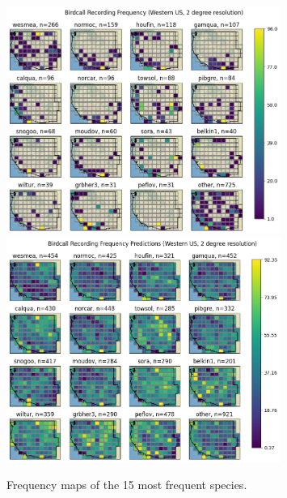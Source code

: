 \documentclass[notitlepage]{article}
\begin{document}
\begin{figure}[H]
\centering
\includegraphics[width=0.8\textwidth]{report/figures/western_us_raw_16.png}
\includegraphics[width=0.8\textwidth]{report/figures/western_us_predict_16.png}
\label{fig:map_16}
\caption{Frequency maps of the 15 most frequent species.}
\end{figure}
\end{document}
